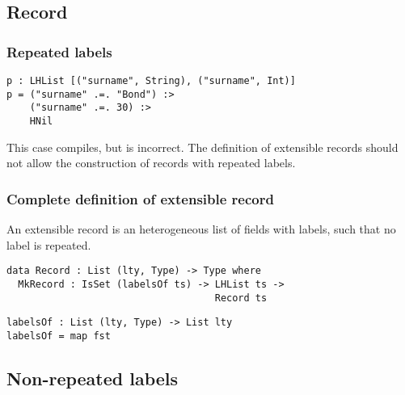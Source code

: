 \documentclass{beamer}
\begin{document}
\subsection{Record}

\begin{frame}[fragile]
\frametitle{Repeated labels}

\begin{example}
\begin{verbatim}
p : LHList [("surname", String), ("surname", Int)]
p = ("surname" .=. "Bond") :> 
    ("surname" .=. 30) :> 
    HNil
\end{verbatim}
\end{example}

\pause

This case compiles, but is incorrect. The definition of extensible records should not allow the construction of records with repeated labels.

\end{frame}

\begin{frame}[fragile]
\frametitle{Complete definition of extensible record}

An extensible record is an heterogeneous list of fields with labels, such that no label is repeated.

\pause

\begin{definition}
\begin{verbatim}
data Record : List (lty, Type) -> Type where
  MkRecord : IsSet (labelsOf ts) -> LHList ts ->
                                    Record ts
\end{verbatim}
\end{definition}

\begin{definition}
\begin{verbatim}
labelsOf : List (lty, Type) -> List lty
labelsOf = map fst
\end{verbatim}
\end{definition}

\end{frame}

\subsection{Non-repeated labels}
\end{document}
